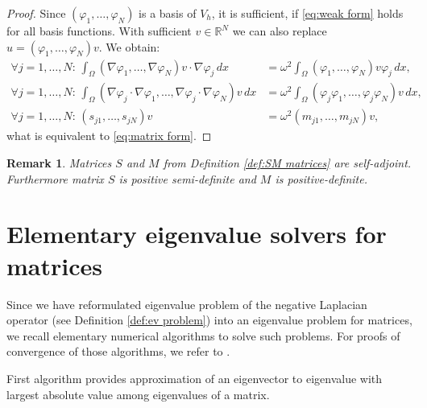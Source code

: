 \documentclass[a4paper,11pt,bibliography=totoc,listof=totoc,headinclude=true,cleardoublepage=empty,oneside]{scrbook}
\newtheorem{rem}[theorem]{Remark}
\newcommand{\R}{\mathbb{R}}
\begin{document}
\begin{proof}
    Since $(\varphi_1, \dots, \varphi_N)$ is a basis of $V_h$, it is sufficient, if \eqref{eq:weak form} holds for all basis functions. With sufficient $v\in \R^N$ we can also replace $u = (\varphi_1, \dots, \varphi_N) v$. We obtain:
    \begin{align*}
        \forall j=1, \dots, N : \, \int_\Omega (\nabla\varphi_1, \dots, \nabla\varphi_N)v\cdot \nabla \varphi_j \, dx &= \omega^2 \int_\Omega (\varphi_1, \dots, \varphi_N)v \varphi_j \, dx, \\
        \forall j=1, \dots, N : \, \int_\Omega (\nabla \varphi_j \cdot \nabla \varphi_1, \dots, \nabla \varphi_j \cdot \nabla \varphi_N) v \, dx &= \omega^2 \int_\Omega (\varphi_j\varphi_1, \dots, \varphi_j\varphi_N)v \,dx, \\ 
        \forall j = 1, \dots, N: \, (s_{j1},\dots,s_{jN})v &= \omega^2 (m_{j1},\dots, m_{jN})v,
    \end{align*}
    what is equivalent to \eqref{eq:matrix form}.
\end{proof}
\begin{rem}
    Matrices $S$ and $M$ from Definition \ref{def:SM matrices} are self-adjoint. Furthermore matrix $S$ is positive semi-definite and $M$ is positive-definite.
\end{rem}




\section{Elementary eigenvalue solvers for matrices}
Since we have reformulated eigenvalue problem of the negative Laplacian operator (see Definition \ref{def:ev problem}) into an eigenvalue problem for matrices, we recall elementary numerical algorithms to solve such problems. For proofs of convergence of those algorithms, we refer to \cite{numericsAB}. 

First algorithm provides approximation of an eigenvector to eigenvalue with largest absolute value among eigenvalues of a matrix. 
\end{document}
